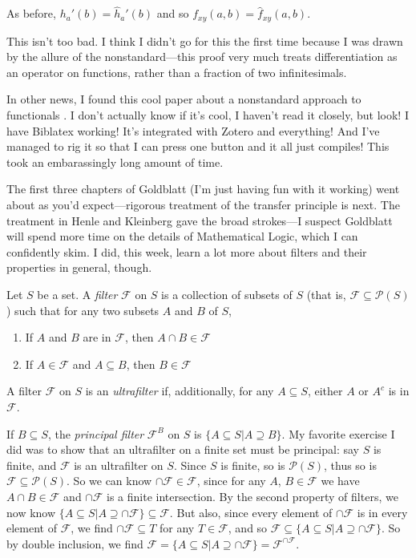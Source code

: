\documentclass{article}
\begin{document}
As before, $h_a'(b) = \hat h_a'(b)$ and so $f_{xy}(a, b) = \hat f_{xy}(a, b)$.

This isn't too bad. I think I didn't go for this the first time because I was drawn by the allure of the nonstandard---this proof very much treats differentiation as an operator on functions, rather than a fraction of two infinitesimals.

In other news, I found this cool paper about a nonstandard approach to functionals \cite{culli2014}. I don't actually know if it's cool, I haven't read it closely, but look! I have Biblatex working! It's integrated with Zotero and everything! And I've managed to rig it so that I can press one button and it all just compiles! This took an embarassingly long amount of time.

The first three chapters of Goldblatt \cite{goldblatt1998} (I'm just having fun with it working) went about as you'd expect---rigorous treatment of the transfer principle is next. The treatment in Henle and Kleinberg \cite{henle1979} gave the broad strokes---I suspect Goldblatt will spend more time on the details of Mathematical Logic, which I can confidently skim. I did, this week, learn a lot more about filters and their properties in general, though.

Let $S$ be a set. A \textit{filter} $\mathcal F$ on $S$ is a collection of subsets of $S$ (that is, $\mathcal F \subseteq \mathcal P (S)$) such that for any two subsets $A$ and $B$ of $S$, \begin{enumerate}
    \item If $A$ and $B$ are in $\mathcal F$, then $A \cap B \in \mathcal F$
    \item If $A \in \mathcal F$ and $A \subseteq B$, then $B \in \mathcal F$
\end{enumerate}

A filter $\mathcal F$ on $S$ is an \textit{ultrafilter} if, additionally, for any $A \subseteq S$, either $A$ or $A^c$ is in $\mathcal F$.

If $B \subseteq S$, the \textit{principal filter} $\mathcal F^B$ on $S$ is $\{A \subseteq S | A \supseteq B\}$. My favorite exercise I did was to show that an ultrafilter on a finite set must be principal: say $S$ is finite, and $\mathcal F$ is an ultrafilter on $S$. Since $S$ is finite, so is $\mathcal P(S)$, thus so is $\mathcal F \subseteq \mathcal P(S)$. So we can know $\cap \mathcal F \in \mathcal F$, since for any $A$, $B \in \mathcal F$ we have $A \cap B \in \mathcal F$ and $\cap \mathcal F$ is a finite intersection. By the second property of filters, we now know $\{A \subseteq S | A \supseteq \cap \mathcal F\} \subseteq \mathcal F$. But also, since every element of $\cap \mathcal F$ is in every element of $\mathcal F$, we find $\cap \mathcal F \subseteq T$ for any $T \in \mathcal F$, and so $\mathcal F \subseteq \{A \subseteq S | A \supseteq \cap \mathcal F\}$. So by double inclusion, we find $\mathcal F = \{A \subseteq S | A \supseteq \cap \mathcal F\} = \mathcal F^{\cap \mathcal F}$.
\end{document}
